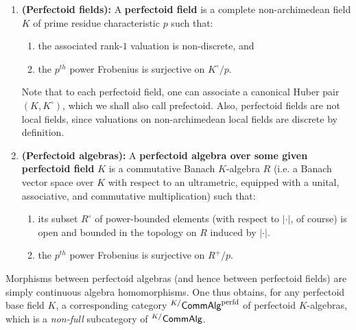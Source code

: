                     \begin{definition} \label{def: perfectoid_fields}
                        \noindent
                        \begin{enumerate}
                            \item \textbf{(Perfectoid fields):} \cite[Definition 3.1]{scholze2011perfectoid} A \textbf{perfectoid field} is a complete non-archimedean field $K$ of prime residue characteristic $p$ such that:
                                \begin{enumerate}
                                    \item the associated rank-$1$ valuation is non-discrete, and
                                    \item the $p^{th}$ power Frobenius is surjective on $K^{\circ}/p$.
                                \end{enumerate}
                            Note that to each perfectoid field, one can associate a canonical Huber pair $(K, K^{\circ})$, which we shall also call prefectoid. Also, perfectoid fields are not local fields, since valuations on non-archimedean local fields are discrete by definition.
                            \item \textbf{(Perfectoid algebras):} \cite[Definition 5.2]{scholze2011perfectoid} A \textbf{perfectoid algebra over some given perfectoid field} $K$ is a commutative Banach $K$-algebra $R$ (i.e. a Banach vector space over $K$ with respect to an ultrametric, equipped with a unital, associative, and commutative multiplication) such that:
                                \begin{enumerate}
                                    \item its subset $R^{\circ}$ of power-bounded elements (with respect to $|\cdot|$, of course) is open and bounded in the topology on $R$ induced by $|\cdot|$.
                                    \item the $p^{th}$ power Frobenius is surjective on $R^+/p$.
                                \end{enumerate}
                        \end{enumerate}
                        Morphisms between perfectoid algebras (and hence between perfectoid fields) are simply continuous algebra homomorphisms. One thus obtains, for any perfectoid base field $K$, a corresponding category ${}^{K/}\mathsf{Comm}\mathsf{Alg}^{\mathrm{perfd}}$ of perfectoid $K$-algebras, which is a \textit{non-full} subcategory of ${}^{K/}\mathsf{Comm}\mathsf{Alg}$. 
                    \end{definition}
